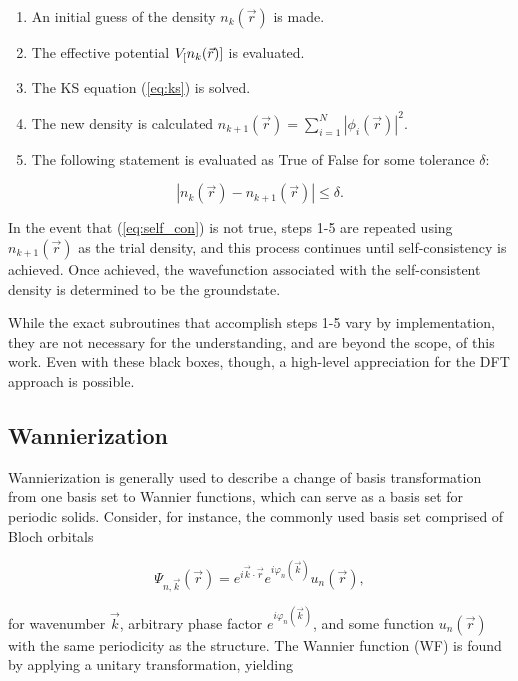         \begin{enumerate}
            \item An initial guess of the density $n_k(\Vec{r})$ is made.
            \item The effective potential $V_\text[n_k(\vec{r})]$ is evaluated.
            \item The KS equation (\ref{eq:ks}) is solved.
            \item The new density is calculated $n_{k+1}(\Vec{r}) = \sum\limits_{i=1}^N |\phi_i(\vec{r})|^2$.
            \item The following statement is evaluated as True of False for some tolerance $\delta$:
        \end{enumerate}
        
        \begin{equation}
        \label{eq:self_con}
            |n_{k}(\vec{r}) - n_{k+1}(\vec{r})| \le \delta.
        \end{equation}
        
        \noindent In the event that (\ref{eq:self_con}) is not true, steps 1-5 are repeated using $n_{k+1}(\Vec{r})$ as the trial density, and this process continues until self-consistency is achieved. Once achieved, the wavefunction associated with the self-consistent density is determined to be the groundstate.
        
        While the exact subroutines that accomplish steps 1-5 vary by implementation, they are not necessary for the understanding, and are beyond the scope, of this work. Even with these black boxes, though, a high-level appreciation for the DFT approach is possible.
    
    \subsection{Wannierization}
    
    Wannierization is generally used to describe a change of basis transformation from one basis set to Wannier functions, which can serve as a basis set for periodic solids. Consider, for instance, the commonly used basis set comprised of Bloch orbitals
    
    \begin{equation}
    \label{eq:wan_1}
        \Psi_{n,\vec{k}}(\Vec{r}) = e^{i\Vec{k}\cdot\Vec{r}} e^{i\varphi_n(\vec{k})} u_n(\vec{r}), 
    \end{equation}
    
    \noindent for wavenumber $\vec{k}$, arbitrary phase factor $e^{i\varphi_n(\vec{k})}$, and some function $u_n(\vec{r})$ with the same periodicity as the structure. The Wannier function (WF) is found by applying a unitary transformation, yielding
    
